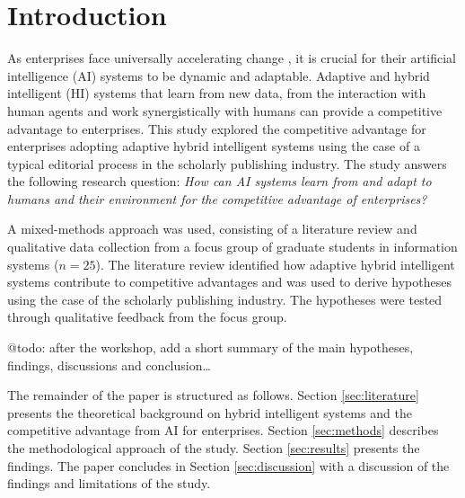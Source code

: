 \section{Introduction}
\label{sec:introduction}

As enterprises face universally accelerating change \citep{eliazarUniversalityAcceleratingChange2018}, it
is crucial for their artificial intelligence (AI) systems to be dynamic and adaptable. Adaptive and hybrid
intelligent (HI) systems that learn from new data, from the interaction with human agents and work
synergistically with humans can provide a competitive advantage to enterprises. This study explored the
competitive advantage for enterprises adopting adaptive hybrid intelligent systems using the case of a
typical editorial process in the scholarly publishing industry. The study answers the following research
question: \textit{How can AI systems learn from and adapt to humans and their environment for the
competitive advantage of enterprises?}

A mixed-methods approach was used, consisting of a literature review and qualitative data collection from
a focus group of graduate students in information systems ($n = 25$). The literature review identified how 
adaptive hybrid intelligent systems contribute to competitive advantages and was used to derive hypotheses
using the case of the scholarly publishing industry. The hypotheses were tested through qualitative feedback
from the focus group.

{\color{purple} @todo: after the workshop, add a short summary of the main hypotheses, findings, 
discussions and conclusion\dots}

The remainder of the paper is structured as follows. Section \ref{sec:literature} presents the theoretical
background on hybrid intelligent systems and the competitive advantage from AI for enterprises. Section
\ref{sec:methods} describes the methodological approach of the study. Section \ref{sec:results} presents
the findings. The paper concludes in Section \ref{sec:discussion} with a discussion of the findings and
limitations of the study.